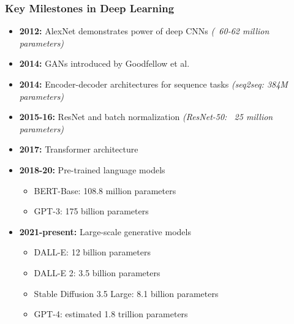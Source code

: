 \documentclass[5pt,aspectratio=169]{beamer}
\begin{document}
\begin{frame}
\frametitle{Key Milestones in Deep Learning}
\begin{itemize}
    \item \textbf{2012:} AlexNet demonstrates power of deep CNNs \textit{(~60-62 million parameters)}
    \item \textbf{2014:} GANs introduced by Goodfellow et al.
    \item \textbf{2014:} Encoder-decoder architectures for sequence tasks \textit{(seq2seq: 384M parameters)}
    \item \textbf{2015-16:} ResNet and batch normalization \textit{(ResNet-50: ~25 million parameters)}
    \item \textbf{2017:} Transformer architecture
    \item \textbf{2018-20:} Pre-trained language models
        \begin{itemize}
            \item BERT-Base: 108.8 million parameters
            \item GPT-3: 175 billion parameters
        \end{itemize}
    \item \textbf{2021-present:} Large-scale generative models
        \begin{itemize}
            \item DALL-E: 12 billion parameters
            \item DALL-E 2: 3.5 billion parameters
            \item Stable Diffusion 3.5 Large: 8.1 billion parameters
            \item GPT-4: estimated 1.8 trillion parameters
        \end{itemize}
\end{itemize}
\end{frame}
\end{document}
